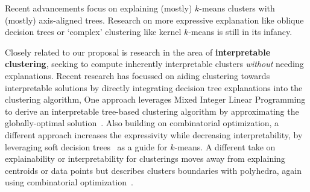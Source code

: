\documentclass[a4paper,11pt]{article}
\begin{document}
Recent advancements focus on explaining (mostly) $k$-means clusters with (mostly) axis-aligned trees. 
Research on more expressive explanation like oblique decision trees or `complex' clustering like kernel $k$-means is still in its infancy.

Closely related to our proposal is research in the area of \textbf{interpretable clustering},
seeking to compute inherently interpretable clusters \emph{without} needing \posthoc explanations.
Recent research has focussed on aiding clustering towards interpretable solutions by directly integrating decision tree explanations into the clustering algorithm,
One approach leverages Mixed Integer Linear Programming to derive an interpretable tree-based clustering algorithm by approximating the globally-optimal solution~\cite{bertsimas2021interpretable}. 
Also building on combinatorial optimization, a different approach increases the expressivity while decreasing interpretability, by leveraging soft decision trees~\cite{cohen2023interpretable} as a guide for $k$-means. 
A different take on explainability or interpretability for clusterings moves away from explaining centroids or data points but describes clusters boundaries with polyhedra, again using combinatorial optimization~\cite{lawless2023polyhedral}. 


\end{document}

